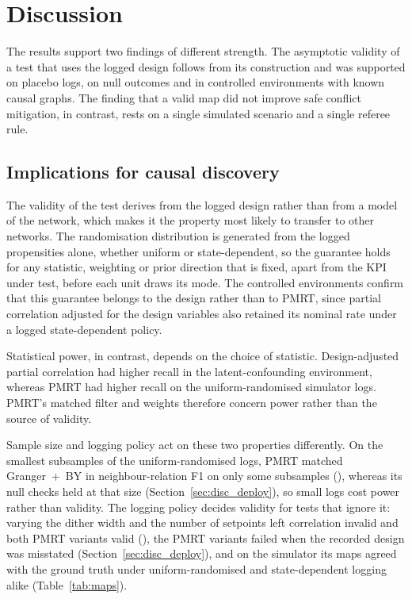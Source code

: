 \section{Discussion}
\label{sec:discussion}

The results support two findings of different strength. The asymptotic validity of a test that uses the logged design
follows from its construction and was supported on placebo logs, on null outcomes and in controlled environments with known causal
graphs. The finding that a valid map did not improve safe conflict mitigation, in contrast, rests on a single simulated
scenario and a single referee rule.

\subsection{Implications for causal discovery}
\label{sec:disc_discovery}

The validity of the test derives from the logged design rather than from a model of the network, which makes it the
property most likely to transfer to other networks. The randomisation distribution is generated from the logged
propensities alone, whether uniform or state-dependent, so the guarantee holds for any statistic, weighting or prior
direction that is fixed, apart from the KPI under test, before each unit draws its mode. The controlled environments confirm that this guarantee belongs to the
design rather than to PMRT, since partial correlation adjusted for the design variables also retained its nominal rate
under a logged state-dependent policy.

Statistical power, in contrast, depends on the choice of statistic. Design-adjusted partial correlation had higher recall in the
latent-confounding environment, whereas PMRT had higher recall on the uniform-randomised simulator logs. PMRT's
matched filter and weights therefore concern power rather than the source of validity.

Sample size and logging policy act on these two properties differently. On the smallest subsamples of the
uniform-randomised logs, PMRT matched Granger~+~BY in neighbour-relation F1 on only some subsamples
(), whereas its null checks held at that size (Section~\ref{sec:disc_deploy}), so small logs cost
power rather than validity. The logging policy decides validity for tests that ignore it: varying the dither width and
the number of setpoints left correlation invalid and both PMRT variants valid (), the PMRT variants failed when
the recorded design was misstated (Section~\ref{sec:disc_deploy}), and on the simulator its maps agreed with the ground
truth under uniform-randomised and state-dependent logging alike (Table~\ref{tab:maps}).

